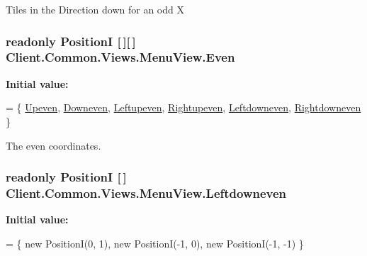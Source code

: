 Tiles in the Direction down for an odd X 

\hypertarget{classClient_1_1Common_1_1Views_1_1MenuView_a255305ea63fc1409619cea474f9fec30}{}
\subsubsection[{Even}]{\setlength{\rightskip}{0pt plus 5cm}readonly {\bf Position\+I} \mbox{[}$\,$\mbox{]}\mbox{[}$\,$\mbox{]} Client.\+Common.\+Views.\+Menu\+View.\+Even\hspace{0.3cm}{\ttfamily [static]}}\label{classClient_1_1Common_1_1Views_1_1MenuView_a255305ea63fc1409619cea474f9fec30}
{\bfseries Initial value\+:}
\begin{DoxyCode}
=
            \{
                \hyperlink{classClient_1_1Common_1_1Views_1_1MenuView_ad5d3faf457e317d3c0757a13ff310e0c}{Upeven},
                \hyperlink{classClient_1_1Common_1_1Views_1_1MenuView_a3c8065c208ad29887f55bb7b7e8f2868}{Downeven},
                \hyperlink{classClient_1_1Common_1_1Views_1_1MenuView_a89a9af01e575d4fd95b93697fd1c21da}{Leftupeven},
                \hyperlink{classClient_1_1Common_1_1Views_1_1MenuView_a36b0ad902b98487477a87442d088d747}{Rightupeven},
                \hyperlink{classClient_1_1Common_1_1Views_1_1MenuView_a9023c2bcec1cdb52198b9dc975fbc257}{Leftdowneven},
                \hyperlink{classClient_1_1Common_1_1Views_1_1MenuView_ae711e0210073a31a2bf15ad1d77e8478}{Rightdowneven}
            \}
\end{DoxyCode}


The even coordinates. 

\hypertarget{classClient_1_1Common_1_1Views_1_1MenuView_a9023c2bcec1cdb52198b9dc975fbc257}{}
\subsubsection[{Leftdowneven}]{\setlength{\rightskip}{0pt plus 5cm}readonly {\bf Position\+I} \mbox{[}$\,$\mbox{]} Client.\+Common.\+Views.\+Menu\+View.\+Leftdowneven\hspace{0.3cm}{\ttfamily [static]}}\label{classClient_1_1Common_1_1Views_1_1MenuView_a9023c2bcec1cdb52198b9dc975fbc257}
{\bfseries Initial value\+:}
\begin{DoxyCode}
=
            \{
                \textcolor{keyword}{new} PositionI(0, 1),
                \textcolor{keyword}{new} PositionI(-1, 0),
                \textcolor{keyword}{new} PositionI(-1, -1)
            \}
\end{DoxyCode}


